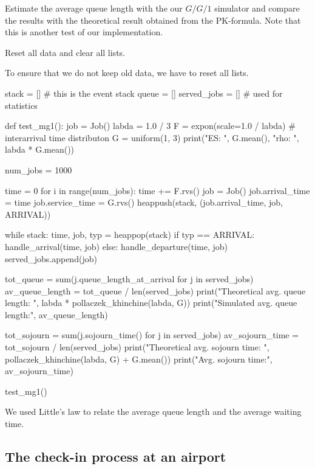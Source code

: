 \begin{exercise}
  Estimate the average queue length with the our $G/G/1$ simulator and compare the results with the theoretical result obtained from the PK-formula.
  Note that this is another test of our implementation.
\begin{hint}
Reset all data and clear all lists.
\end{hint}

\begin{solution}
To ensure that we do not keep old data, we have to reset all lists.

\begin{pyverbatim}
stack = []  # this is the event stack
queue = []
served_jobs = []  # used for statistics


def test_mg1():
    job = Job()
    labda = 1.0 / 3
    F = expon(scale=1.0 / labda)  # interarrival time distributon
    G = uniform(1, 3)
    print("ES: ", G.mean(), "rho: ", labda * G.mean())

    num_jobs = 1000

    time = 0
    for i in range(num_jobs):
        time += F.rvs()
        job = Job()
        job.arrival_time = time
        job.service_time = G.rvs()
        heappush(stack, (job.arrival_time, job, ARRIVAL))

    while stack:
        time, job, typ = heappop(stack)
        if typ == ARRIVAL:
            handle_arrival(time, job)
        else:
            handle_departure(time, job)
            served_jobs.append(job)

    tot_queue = sum(j.queue_length_at_arrival for j in served_jobs)
    av_queue_length = tot_queue / len(served_jobs)
    print("Theoretical avg. queue length: ", labda * pollaczek_khinchine(labda, G))
    print("Simulated avg. queue length:", av_queue_length)

    tot_sojourn = sum(j.sojourn_time() for j in served_jobs)
    av_sojourn_time = tot_sojourn / len(served_jobs)
    print("Theoretical avg. sojourn time: ", pollaczek_khinchine(labda, G) + G.mean())
    print("Avg. sojourn time:", av_sojourn_time)


test_mg1()
\end{pyverbatim}
We used Little's law to relate the average queue length and the average waiting time.
  \end{solution}
\end{exercise}




\subsection{The check-in process at an airport}
\label{sec:check-in-process-at}

